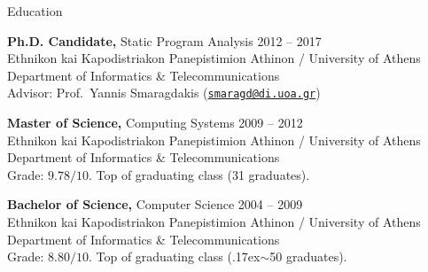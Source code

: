 \documentclass{resume}
\begin{document}
\newcommand{\mytilde}{\raise.17ex\hbox{$\scriptstyle\mathtt{\sim}$}}



\begin{rSection}{Education}

{\bf Ph.D. Candidate,} Static Program Analysis \hfill {2012 -- 2017} \\
Ethnikon kai Kapodistriakon Panepistimion Athinon / University of Athens \\
Department of Informatics \& Telecommunications \\
Advisor: Prof.~Yannis Smaragdakis
(\href{mailto:smaragd@di.uoa.gr}{\nolinkurl{smaragd@di.uoa.gr}})

{\bf Master of Science,} Computing Systems \hfill {2009 -- 2012} \\
Ethnikon kai Kapodistriakon Panepistimion Athinon / University of Athens \\
Department of Informatics \& Telecommunications \\
Grade: $9.78 / 10$. Top of graduating class (31 graduates).

{\bf Bachelor of Science,} Computer Science \hfill {2004 -- 2009}  \\
Ethnikon kai Kapodistriakon Panepistimion Athinon / University of Athens \\
Department of Informatics \& Telecommunications \\
Grade: $8.80 / 10$. Top of graduating class (\mytilde{}50 graduates).

\end{rSection}

\end{document}
